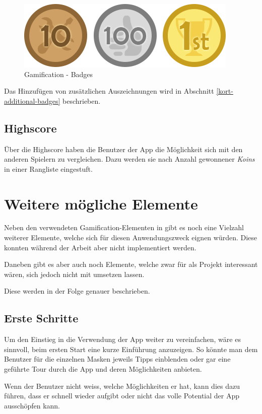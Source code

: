 \begin{figure}[H]
	\centering
	\includegraphics[scale=0.7]{images/gamification/gamification-badges}
	\caption{Gamification - Badges}
	\label{gamification-badges}
\end{figure}

Das Hinzufügen von zusätzlichen Auszeichnungen wird in Abschnitt \ref{kort-additional-badges} beschrieben.

\subsection{Highscore}
Über die Highscore haben die Benutzer der App die Möglichkeit sich mit den anderen Spielern zu vergleichen.
Dazu werden sie nach Anzahl gewonnener \emph{Koins} in einer Rangliste eingestuft.

\section{Weitere mögliche Elemente}
Neben den verwendeten \gls{Gamification}-Elementen in \kort{} gibt es noch eine Vielzahl weiterer Elemente, welche sich für diesen Anwendungszweck eignen würden.
Diese konnten während der Arbeit aber nicht implementiert werden.

Daneben gibt es aber auch noch Elemente, welche zwar für  als Projekt interessant wären, sich jedoch nicht mit \kort{} umsetzen lassen.

Diese werden in der Folge genauer beschrieben.

\subsection{Erste Schritte}
Um den Einstieg in die Verwendung der App weiter zu vereinfachen, wäre es sinnvoll, beim ersten Start eine kurze Einführung anzuzeigen.
So könnte man dem Benutzer für die einzelnen Masken jeweils Tipps einblenden oder gar eine geführte Tour durch die App und deren Möglichkeiten anbieten.

Wenn der Benutzer nicht weiss, welche Möglichkeiten er hat, kann dies dazu führen, dass er schnell wieder aufgibt oder nicht das volle Potential der App ausschöpfen kann.

